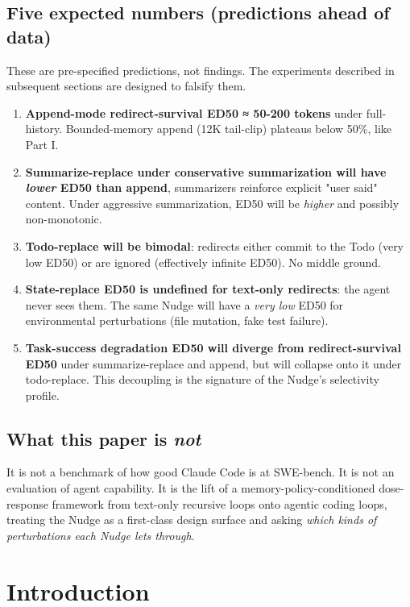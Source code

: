 \documentclass{article}
\theoremstyle{plain}
\theoremstyle{definition}
\begin{document}
\subsection*{Five expected numbers (predictions ahead of data)}

These are pre-specified predictions, not findings. The experiments described in subsequent sections are designed to falsify them.

\begin{enumerate}
  \item \textbf{Append-mode redirect-survival ED50 ≈ 50-200 tokens} under full-history. Bounded-memory append (12K tail-clip) plateaus below 50\%, like Part I.
  \item \textbf{Summarize-replace under conservative summarization will have \textit{lower} ED50 than append}, summarizers reinforce explicit "user said" content. Under aggressive summarization, ED50 will be \textit{higher} and possibly non-monotonic.
  \item \textbf{Todo-replace will be bimodal}: redirects either commit to the Todo (very low ED50) or are ignored (effectively infinite ED50). No middle ground.
  \item \textbf{State-replace ED50 is undefined for text-only redirects}: the agent never sees them. The same Nudge will have a \textit{very low} ED50 for environmental perturbations (file mutation, fake test failure).
  \item \textbf{Task-success degradation ED50 will diverge from redirect-survival ED50} under summarize-replace and append, but will collapse onto it under todo-replace. This decoupling is the signature of the Nudge's selectivity profile.
\end{enumerate}

\subsection*{What this paper is \textit{not}}

It is not a benchmark of how good Claude Code is at SWE-bench. It is not an evaluation of agent capability. It is the lift of a memory-policy-conditioned dose-response framework from text-only recursive loops onto agentic coding loops, treating the Nudge as a first-class design surface and asking \textit{which kinds of perturbations each Nudge lets through}.


\section{Introduction}
\end{document}
